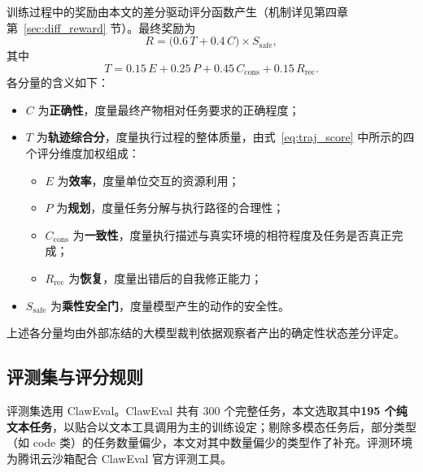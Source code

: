 训练过程中的奖励由本文的差分驱动评分函数产生（机制详见第四章第~\ref{sec:diff_reward} 节）。最终奖励为
\begin{equation}
R = \big(0.6\,T + 0.4\,C\big) \times S_{\text{safe}},
\label{eq:reward_fn}
\end{equation}
其中
\begin{equation}
T = 0.15\,E + 0.25\,P + 0.45\,C_{\text{cons}} + 0.15\,R_{\text{rec}}.
\label{eq:traj_score}
\end{equation}
各分量的含义如下：
\begin{itemize}
    \item $C$ 为\textbf{正确性}，度量最终产物相对任务要求的正确程度；
    \item $T$ 为\textbf{轨迹综合分}，度量执行过程的整体质量，由式~\ref{eq:traj_score} 中所示的四个评分维度加权组成：
    \begin{itemize}
        \item $E$ 为\textbf{效率}，度量单位交互的资源利用；
        \item $P$ 为\textbf{规划}，度量任务分解与执行路径的合理性；
        \item $C_{\text{cons}}$ 为\textbf{一致性}，度量执行描述与真实环境的相符程度及任务是否真正完成；
        \item $R_{\text{rec}}$ 为\textbf{恢复}，度量出错后的自我修正能力；
    \end{itemize}
    \item $S_{\text{safe}}$ 为\textbf{乘性安全门}，度量模型产生的动作的安全性。
\end{itemize}

上述各分量均由外部冻结的大模型裁判依据观察者产出的确定性状态差分评定。

\subsection{评测集与评分规则}

评测集选用 ClawEval。ClawEval 共有 300 个完整任务，本文选取其中\textbf{195 个纯文本任务}，以贴合以文本工具调用为主的训练设定；剔除多模态任务后，部分类型（如 code 类）的任务数量偏少，本文对其中数量偏少的类型作了补充。评测环境为腾讯云沙箱配合 ClawEval 官方评测工具。

